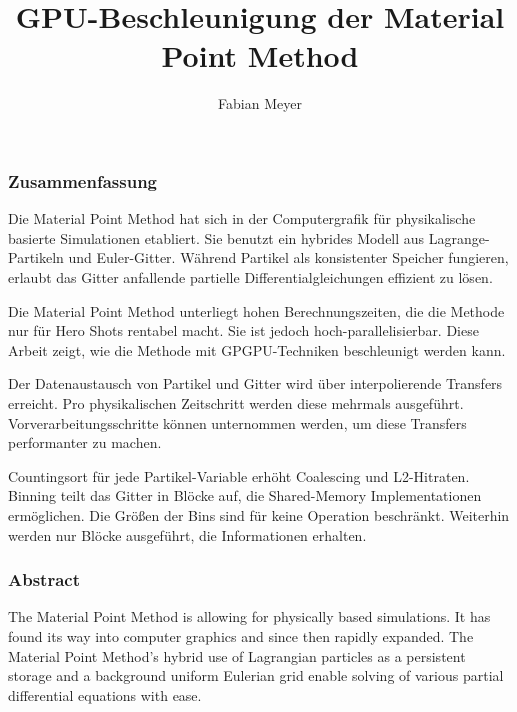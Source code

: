 \documentclass[m,times]{cgMA}
\begin{document}
\author{Fabian Meyer}
\title{GPU-Beschleunigung der Material Point Method}

\maketitle

\clearpage
{}

\vfill
\begin{center}
\subsubsection*{Zusammenfassung}
\end{center}
Die Material Point Method hat sich in der Computergrafik für physikalische basier\-te Simulationen etabliert. Sie benutzt ein hybrides Modell aus Lagrange-Partikeln und Euler-Gitter. Während Partikel als konsistenter Speicher fungieren, erlaubt das Gitter anfallende partielle Differentialgleichungen effizient zu lösen.

\noindent Die Material Point Method unterliegt hohen Berechnungszeiten, die die Methode nur für Hero Shots rentabel macht. Sie ist jedoch hoch-parallelisierbar. Diese Arbeit zeigt, wie die Methode mit GPGPU-Techniken beschleunigt werden kann.

\noindent Der Datenaustausch von Partikel und Gitter wird über interpolierende Transfers erreicht. Pro physikalischen Zeitschritt werden diese mehrmals ausgeführt. Vorverarbeitungsschritte können unternommen werden, um diese Transfers performanter zu machen.

\noindent Countingsort für jede Partikel-Variable erhöht Coalescing und L2-Hitraten. Binning teilt das Gitter in Blöcke auf, die Shared-Memory Implementationen ermög\-lich\-en. Die Größen der Bins sind für keine Operation beschränkt. Weiterhin werden nur Blöcke ausgeführt, die Informationen erhalten.

\vfill
\begin{center}
\subsubsection*{Abstract}
\end{center}
The Material Point Method is allowing for physically based simulations. It has found its way into computer graphics and since then rapidly expanded. The Material Point Method's hybrid use of Lagrangian particles as a persistent storage and a background uniform Eulerian grid enable solving of various partial differential equations with ease.
\end{document}
